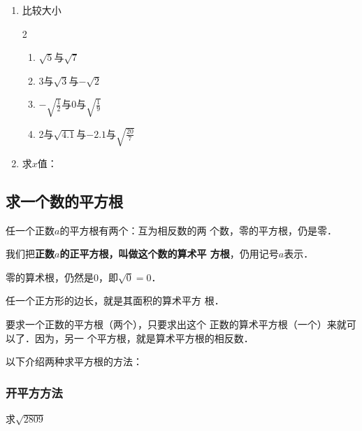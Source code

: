 \begin{ex}
\begin{enumerate}
    \item 比较大小
    \begin{multicols}{2}
\begin{enumerate}
    \item $\sqrt{5}$与$\sqrt{7}$
    \item 3与$\sqrt{3}$与$-\sqrt{2}$
    \item $-\sqrt{\frac{1}{2}}$与0与$\sqrt{\frac{1}{9}}$
    \item 2与$\sqrt{4.1}$与$-2.1$与$\sqrt{\frac{20}{7}}$
\end{enumerate}
    \end{multicols}

    \item 求$x$值：
\begin{enumerate}
\end{enumerate}
\end{enumerate}
    
\end{ex}

\subsection{求一个数的平方根}
任一个正数$a$的平方根有两个：互为相反数的两
个数，零的平方根，仍是零．

我们把\textbf{正数$a$的正平方根，叫做这个数的算术平
方根}，仍用记号$a$表示．

零的算术根，仍然是0，即$\sqrt{0}=0$．

任一个正方形的边长，就是其面积的算术平方
根．

要求一个正数的平方根（两个），只要求出这个
正数的算术平方根（一个）来就可以了．因为，另一
个平方根，就是算术平方根的相反数．

以下介绍两种求平方根的方法：

\subsubsection{开平方方法}
\begin{example}
    求$\sqrt{2809}$
\end{example}

